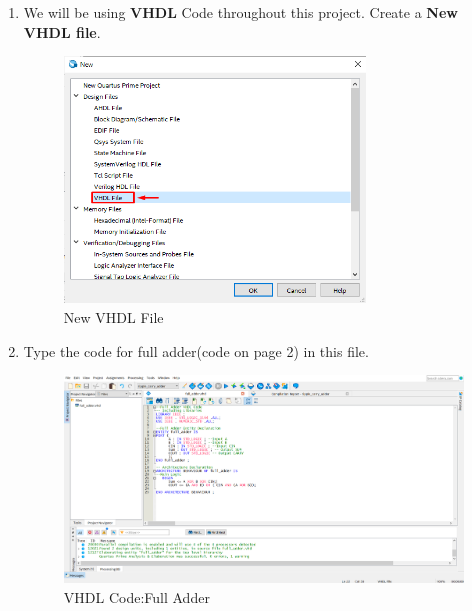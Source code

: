 \documentclass[12pt,singleside,a4paper]{article}
\begin{document}
\begin{enumerate}
    \item We will be using \textbf{VHDL} Code throughout this project. Create a \textbf{New VHDL file}.
    \begin{figure}[H]
        \centering
    \includegraphics[width=8cm,keepaspectratio]{img3.png}
    \caption{New VHDL File}
    \end{figure}
    \newpage
    \item Type the code for full adder(code on page 2) in this file.
    \begin{figure}[H]
        \centering
    \includegraphics[width=14cm,keepaspectratio]{img3_1.png}
    \caption{VHDL Code:Full Adder}
    \end{figure}
    

\end{enumerate}
\end{document}
